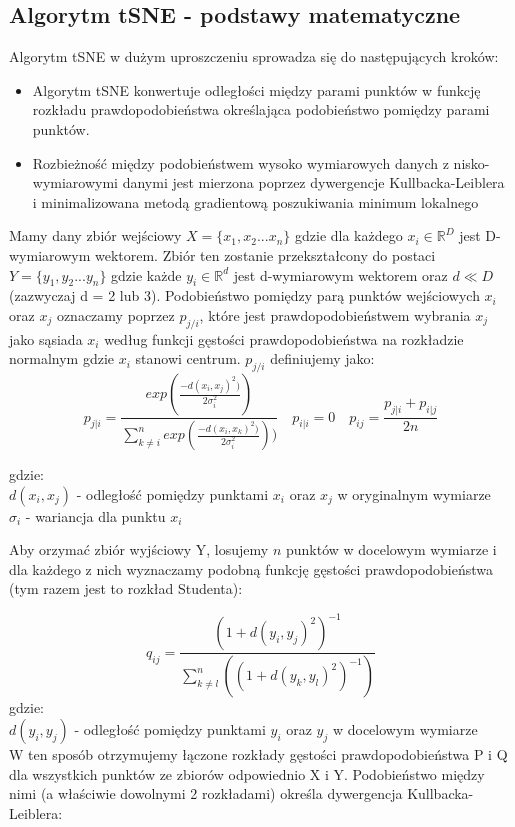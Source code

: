 \documentclass{article}
\begin{document}
\subsection{Algorytm tSNE - podstawy matematyczne}
Algorytm tSNE w dużym uproszczeniu sprowadza się do następujących kroków:
\begin{itemize}
	\item Algorytm tSNE konwertuje odległości między parami punktów w funkcję rozkładu prawdopodobieństwa określająca podobieństwo pomiędzy parami punktów.  
	\item Rozbieżność między podobieństwem wysoko wymiarowych danych z nisko-wymiarowymi danymi jest mierzona poprzez dywergencje Kullbacka-Leiblera i minimalizowana metodą gradientową poszukiwania minimum lokalnego
\end{itemize}

Mamy dany zbiór wejściowy $X = \{x_1, x_2 ... x_n\}$  gdzie dla każdego $x_i \in \mathbb{R}^{D} $ jest D-wymiarowym wektorem. Zbiór ten zostanie przekształcony do postaci $Y = \{y_1, y_2 ... y_n\}$  gdzie każde $y_i \in \mathbb{R}^{d} $ jest d-wymiarowym wektorem oraz $ d \ll D $ (zazwyczaj d = 2 lub 3). Podobieństwo pomiędzy parą punktów wejściowych $ x_i $ oraz $ x_j $ oznaczamy poprzez $ p_{j/i} $, które jest prawdopodobieństwem wybrania $ x_j $ jako sąsiada $ x_i $ według funkcji gęstości prawdopodobieństwa na rozkładzie normalnym gdzie $ x_i $ stanowi centrum.  $ p_{j/i} $ definiujemy jako:
\[
     p_{j|i} = \frac{exp(\frac{-d(x_i,x_j)^{2})}{2\sigma_i^{2}})}{\sum_{k \neq i}^{n} exp(\frac{-d(x_i,x_k)^{2})}{2\sigma_i^{2}}))} \quad p_{i|i} = 0  \quad p_{ij} = \frac{p_{j|i}+p_{i|j}}{2n} 
\]

gdzie: \\
$d(x_i,x_j)$ - odległość pomiędzy punktami $x_i$ oraz $x_j$ w oryginalnym wymiarze\\
$\sigma_i$ - wariancja dla punktu $x_i$

Aby orzymać zbiór wyjściowy Y, losujemy $n$ punktów w docelowym wymiarze i dla każdego z nich wyznaczamy podobną funkcję gęstości prawdopodobieństwa (tym razem jest to rozkład Studenta):

\[
     q_{ij} = \frac{(1+d(y_i,y_j)^{2})^{-1}} {\sum_{k \neq l}^{n}((1+d(y_k,y_l)^{2})^{-1})}
\]
gdzie: \\
$d(y_i,y_j)$ - odległość pomiędzy punktami $y_i$ oraz $y_j$ w docelowym wymiarze\\

W ten sposób otrzymujemy łączone rozkłady gęstości prawdopodobieństwa P i Q dla wszystkich punktów ze zbiorów odpowiednio X i Y. Podobieństwo między nimi (a właściwie dowolnymi 2 rozkładami) określa dywergencja Kullbacka-Leiblera:
\end{document}
